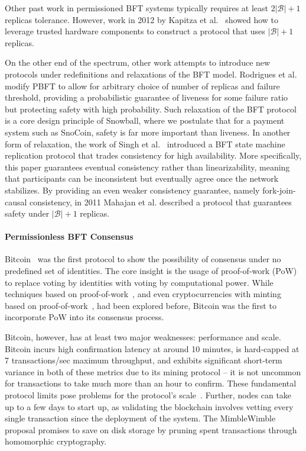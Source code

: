 Other past work in permissioned BFT systems typically requires at least $2|\mathcal{B}|+1$ replicas tolerance. 
However, work in 2012 by Kapitza et al.~\cite{kapitza2012cheapbft} showed how to leverage trusted hardware components to construct a protocol that uses $|\mathcal{B}|+1$ replicas. 

On the other end of the spectrum, other work attempts to introduce new protocols under redefinitions and relaxations of the BFT model. 
Rodrigues et al.~\cite{rodrigues2007large} modify PBFT to allow for arbitrary choice of number of replicas and failure threshold, providing a probabilistic guarantee of liveness for some failure ratio but protecting safety with high probability. 
Such relaxation of the BFT protocol is a core design principle of Snowball, where we postulate that for a payment system such as SnoCoin, safety is far more important than liveness. 
In another form of relaxation, the work of Singh et al.~\cite{singh2009zeno} introduced a BFT state machine replication protocol that trades consistency for high availability. 
More specifically, this paper guarantees eventual consistency rather than linearizability, meaning that participants can be inconsistent but eventually agree once the network stabilizes. 
By providing an even weaker consistency guarantee, namely fork-join-causal consistency, in 2011 Mahajan et al.\cite{mahajan2011depot} described a protocol that guarantees safety under $|\mathcal{B}|+1$ replicas. 

\paragraph{Permissionless BFT Consensus}
Bitcoin~\cite{nakamoto2008bitcoin} was the first protocol to show the possibility of consensus under no predefined set of identities. The core insight is the usage of proof-of-work (PoW) to replace voting by identities with voting by computational power. While techniques based on proof-of-work~\cite{dwork1992pricing,aspnes2005exposing}, and even cryptocurrencies with minting based on proof-of-work~\cite{vishnumurthy2003karma,rivest1997payword}, had been explored before, Bitcoin was the first to incorporate PoW into its consensus process.

Bitcoin, however, has at least two major weaknesses: performance and scale. 
Bitcoin incurs high confirmation latency at around 10 minutes, is hard-capped at 7 transactions/sec maximum throughput, and exhibits significant short-term variance in both of these metrics due to its mining protocol -- it is not uncommon for transactions to take much more than an hour to confirm. 
These fundamental protocol limits pose problems for the protocol's scale~\cite{croman2016scaling}. 
Further, nodes can take up to a few days to start up, as validating the blockchain involves vetting every single transaction since the deployment of the system. 
The MimbleWimble~\cite{mimblewimble} proposal promises to save on disk storage by pruning spent transactions through homomorphic cryptography. 

